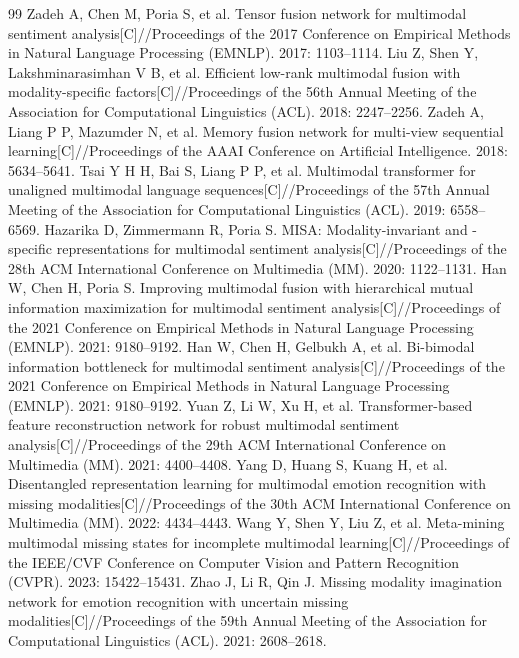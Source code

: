 \documentclass[UTF8,a4paper,11pt]{ctexart}
\newcounter{q2algorithm}
\begin{document}
\begin{thebibliography}{99}
 Zadeh A, Chen M, Poria S, et al. Tensor fusion network for multimodal sentiment analysis[C]//Proceedings of the 2017 Conference on Empirical Methods in Natural Language Processing (EMNLP). 2017: 1103--1114.
 Liu Z, Shen Y, Lakshminarasimhan V B, et al. Efficient low-rank multimodal fusion with modality-specific factors[C]//Proceedings of the 56th Annual Meeting of the Association for Computational Linguistics (ACL). 2018: 2247--2256.
 Zadeh A, Liang P P, Mazumder N, et al. Memory fusion network for multi-view sequential learning[C]//Proceedings of the AAAI Conference on Artificial Intelligence. 2018: 5634--5641.
 Tsai Y H H, Bai S, Liang P P, et al. Multimodal transformer for unaligned multimodal language sequences[C]//Proceedings of the 57th Annual Meeting of the Association for Computational Linguistics (ACL). 2019: 6558--6569.
 Hazarika D, Zimmermann R, Poria S. MISA: Modality-invariant and -specific representations for multimodal sentiment analysis[C]//Proceedings of the 28th ACM International Conference on Multimedia (MM). 2020: 1122--1131.
 Han W, Chen H, Poria S. Improving multimodal fusion with hierarchical mutual information maximization for multimodal sentiment analysis[C]//Proceedings of the 2021 Conference on Empirical Methods in Natural Language Processing (EMNLP). 2021: 9180--9192.
 Han W, Chen H, Gelbukh A, et al. Bi-bimodal information bottleneck for multimodal sentiment analysis[C]//Proceedings of the 2021 Conference on Empirical Methods in Natural Language Processing (EMNLP). 2021: 9180--9192.
 Yuan Z, Li W, Xu H, et al. Transformer-based feature reconstruction network for robust multimodal sentiment analysis[C]//Proceedings of the 29th ACM International Conference on Multimedia (MM). 2021: 4400--4408.
 Yang D, Huang S, Kuang H, et al. Disentangled representation learning for multimodal emotion recognition with missing modalities[C]//Proceedings of the 30th ACM International Conference on Multimedia (MM). 2022: 4434--4443.
 Wang Y, Shen Y, Liu Z, et al. Meta-mining multimodal missing states for incomplete multimodal learning[C]//Proceedings of the IEEE/CVF Conference on Computer Vision and Pattern Recognition (CVPR). 2023: 15422--15431.
 Zhao J, Li R, Qin J. Missing modality imagination network for emotion recognition with uncertain missing modalities[C]//Proceedings of the 59th Annual Meeting of the Association for Computational Linguistics (ACL). 2021: 2608--2618.
\end{thebibliography}
\end{document}
